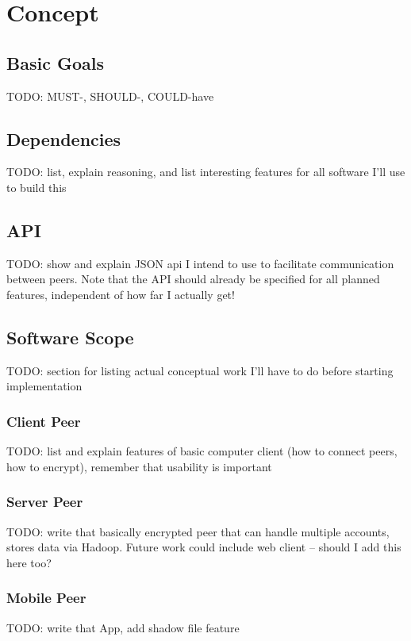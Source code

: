 \chapter{Concept}


\section{Basic Goals}

TODO: MUST-, SHOULD-, COULD-have

\section{Dependencies}

TODO: list, explain reasoning, and list interesting features for all software I'll use to build this

\section{API}

TODO: show and explain JSON api I intend to use to facilitate communication between peers.
Note that the API should already be specified for all planned features, independent of how far I actually get!

\section{Software Scope}

TODO: section for listing actual conceptual work I'll have to do before starting implementation

\subsection{Client Peer}

TODO: list and explain features of basic computer client (how to connect peers, how to encrypt), remember that usability is important

\subsection{Server Peer}

TODO: write that basically encrypted peer that can handle multiple accounts, stores data via Hadoop.
Future work could include web client – should I add this here too?

\subsection{Mobile Peer}

TODO: write that App, add shadow file feature
